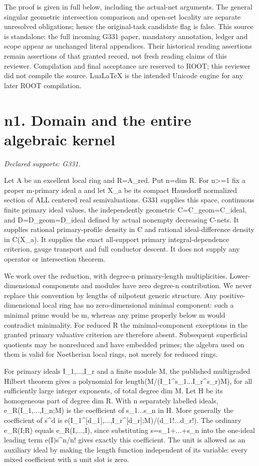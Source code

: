 \documentclass[11pt]{article}
\begin{document}
The proof is given in full below, including the actual-net arguments. The
general singular geometric intersection comparison and open-set locality
are separate unresolved obligations; hence the original-task candidate flag
is false. This source is standalone: the full incoming G331 paper, mandatory
annotation, ledger and scope appear as unchanged literal appendices. Their
historical reading assertions remain assertions of that granted record,
not fresh reading claims of this reviewer. Compilation and final acceptance
are reserved to ROOT; this reviewer did not compile the source. LuaLaTeX
is the intended Unicode engine for any later ROOT compilation.
\tableofcontents
\newpage
\section{n1. Domain and the entire algebraic kernel}
\textit{Declared supports: G331.}

Let A be an excellent local ring and R=A\_red. Put n=dim R. For n>=1 fix a proper m-primary ideal a and let X\_a be its compact Hausdorff normalized section of ALL centered real semivaluations. G331 supplies this space, continuous finite primary ideal values, the independently geometric C=C\_geom=C\_ideal, and D=D\_geom=D\_ideal defined by actual nonempty decreasing C-nets. It supplies rational primary-profile density in C and rational ideal-difference density in C(X\_a). It supplies the exact all-support primary integral-dependence criterion, gauge transport and full conductor descent. It does not supply any operator or intersection theorem.

We work over the reduction, with degree-n primary-length multiplicities. Lower-dimensional components and modules have zero degree-n contribution. We never replace this convention by lengths of nilpotent generic structure. Any positive-dimensional local ring has no zero-dimensional minimal component: such a minimal prime would be m, whereas any prime properly below m would contradict minimality. For reduced R the minimal-component exceptions in the granted primary valuative criterion are therefore absent. Subsequent superficial quotients may be nonreduced and have embedded primes; the algebra used on them is valid for Noetherian local rings, not merely for reduced rings.

For primary ideals I\_1,...,I\_r and a finite module M, the published multigraded Hilbert theorem gives a polynomial for length(M/(I\_1\textasciicircum{}s\_1...I\_r\textasciicircum{}s\_r)M), for all sufficiently large integer exponents, of total degree dim M. Let H be its homogeneous part of degree dim R. With n separately labelled ideals, e\_R(I\_1,...,I\_n;M) is the coefficient of s\_1...s\_n in H. More generally the coefficient of s\textasciicircum{}d is e(I\_1\textasciicircum{}[d\_1],...,I\_r\textasciicircum{}[d\_r];M)/(d\_1!...d\_r!). The ordinary e\_R(I;R) equals e\_R(I,...,I), since substituting s=s\_1+...+s\_n into the one-ideal leading term e(I)s\textasciicircum{}n/n! gives exactly this coefficient. The unit is allowed as an auxiliary ideal by making the length function independent of its variable: every mixed coefficient with a unit slot is zero.
\end{document}
